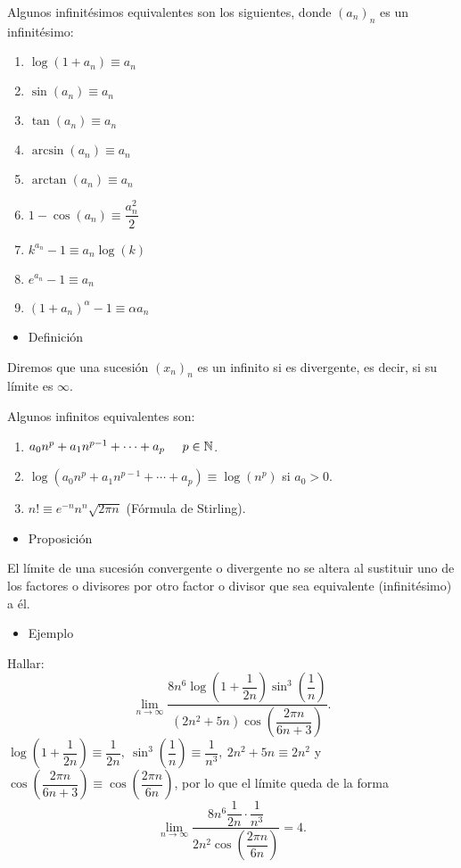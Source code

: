 \documentclass[12pt]{article}
\begin{document}
Algunos infinitésimos equivalentes son los siguientes, donde $(a_n)_n$ es un infinitésimo:
\begin{enumerate}[label=\arabic*)]
	\item $\log(1+a_n)\equiv a_n$
	\item $\sin(a_n)\equiv a_n$
	\item $\tan(a_n)\equiv a_n$
	\item $\arcsin(a_n)\equiv a_n$
	\item $\arctan(a_n)\equiv a_n$
	\item $1-\cos(a_n)\equiv \dfrac{a_n^2}{2}$
	\item $k^{a_n}-1\equiv a_n\log(k)$
	\item $e^{a_n}-1\equiv a_n$
	\item $(1+a_n)^\alpha-1\equiv\alpha a_n$
\end{enumerate}
\begin{itemize}[label=\color{red}\textbullet, leftmargin=*]
	\item \color{lightblue}Definición
\end{itemize}
Diremos que una sucesión $(x_n)_n $ es un infinito si es divergente, es decir, si su límite es $\infty$.

Algunos infinitos equivalentes son:
\begin{enumerate}[label=\arabic*)]
	\item $a_0n^p+a_1n^{p-1}+\cdots+a_p\hspace{0.5cm}p\in\mathbb{N}$.
	\item $\log(a_0n^p+a_1n^{p-1}+\cdots+a_p)\equiv\log(n^p)$ si $a_0>0$.
	\item $n!\equiv e^{-n}n^n\sqrt{2\pi n}$ (Fórmula de Stirling).
\end{enumerate}
\begin{itemize}[label=\color{red}\textbullet, leftmargin=*]
	\item \color{lightblue}Proposición
\end{itemize}
El límite de una sucesión convergente o divergente no se altera al sustituir uno de los factores o divisores por otro factor o divisor que sea equivalente (infinitésimo) a él.
\begin{itemize}[label=\color{red}\textbullet, leftmargin=*]
	\item \color{lightblue}Ejemplo
\end{itemize}
Hallar: \[ \lim_{n\to\infty}\dfrac{8n^6\log\left(1+\dfrac{1}{2n}\right)\sin^3\left(\dfrac{1}{n}\right)}{(2n^2+5n)\cos\left(\dfrac{2\pi n}{6n+3}\right)}. \]
$\log\left(1+\dfrac{1}{2n}\right)\equiv\dfrac{1}{2n},~\sin^3\left(\dfrac{1}{n}\right)\equiv\dfrac{1}{n^3},~2n^2+5n\equiv2n^2$ y $\cos\left(\dfrac{2\pi n}{6n+3}\right)\equiv\cos\left(\dfrac{2\pi n}{6n}\right)$, por lo que el límite queda de la forma \[ \lim_{n\to\infty}\dfrac{8n^6\dfrac{1}{2n}\cdot\dfrac{1}{n^3}}{2n^2\cos\left(\dfrac{2\pi n}{6n}\right)}=4. \]
\end{document}
